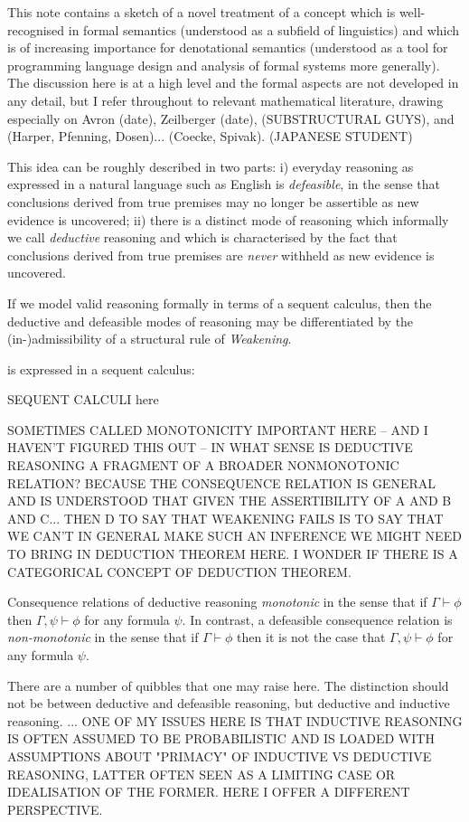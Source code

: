 \documentclass[a4paper,11pt]{report}
\begin{document}
This note contains a sketch of a novel treatment of a concept which is well-recognised in formal semantics (understood as a subfield of linguistics) and which is of increasing importance for denotational semantics (understood as a tool for programming language design and analysis of formal systems more generally). The discussion here is at a high level and the formal aspects are not developed in any detail, but I refer throughout to relevant mathematical literature, drawing especially on Avron (date), Zeilberger (date), (SUBSTRUCTURAL GUYS), and (Harper, Pfenning, Dosen)... (Coecke, Spivak). (JAPANESE STUDENT)

This idea can be roughly described in two parts: i) everyday reasoning as expressed in a natural language such as English is \emph{defeasible}, in the sense that conclusions derived from true premises may no longer be assertible as new evidence is uncovered; ii) there is a distinct mode of reasoning which informally we call \emph{deductive} reasoning and which is characterised by the fact that conclusions derived from true premises are \emph{never} withheld as new evidence is uncovered.

If we model valid reasoning formally in terms of a sequent calculus, then the deductive and defeasible modes of reasoning may be differentiated by the (in-)admissibility of a structural rule of \emph{Weakening}.

is expressed in a sequent calculus:

SEQUENT CALCULI here

SOMETIMES CALLED MONOTONICITY
IMPORTANT HERE -- AND I HAVEN'T FIGURED THIS OUT -- IN WHAT SENSE IS DEDUCTIVE REASONING A FRAGMENT OF A BROADER NONMONOTONIC RELATION? BECAUSE THE CONSEQUENCE RELATION IS GENERAL AND IS UNDERSTOOD THAT GIVEN THE ASSERTIBILITY OF A AND B AND C... THEN D
TO SAY THAT WEAKENING FAILS IS TO SAY THAT WE CAN'T IN GENERAL MAKE SUCH AN INFERENCE
WE MIGHT NEED TO BRING IN DEDUCTION THEOREM HERE. I WONDER IF THERE IS A CATEGORICAL CONCEPT OF DEDUCTION THEOREM.

Consequence relations of deductive reasoning  \emph{monotonic} in the sense that if $\Gamma \vdash \phi$ then $\Gamma, \psi \vdash \phi$ for any formula $\psi$. In contrast, a defeasible consequence relation is \emph{non-monotonic} in the sense that if $\Gamma \vdash \phi$ then it is not the case that $\Gamma, \psi \vdash \phi$ for any formula $\psi$.

There are a number of quibbles that one may raise here. The distinction should not be between deductive and defeasible reasoning, but deductive and inductive reasoning. ... ONE OF MY ISSUES HERE IS THAT INDUCTIVE REASONING IS OFTEN ASSUMED TO BE PROBABILISTIC AND IS LOADED WITH ASSUMPTIONS ABOUT "PRIMACY" OF INDUCTIVE VS DEDUCTIVE REASONING, LATTER OFTEN SEEN AS A LIMITING CASE OR IDEALISATION OF THE FORMER. HERE I OFFER A DIFFERENT PERSPECTIVE.
\end{document}
